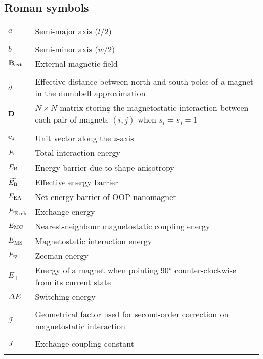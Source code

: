 \subsection*{Roman symbols}
\begin{longtable}[l]{p{60pt} p{350pt}}
	$a$ & Semi-major axis ($l/2$) \\
	&\\

	$b$ & Semi-minor axis ($w/2$) \\
	$\boldsymbol{\mathbf{B}}_\mathrm{ext}$ & External magnetic field \\
	&\\

	$d$ & Effective distance between north and south poles of a magnet in the dumbbell approximation \\
	$\boldsymbol{\mathbf{D}}$ & $N \times N$ matrix storing the magnetostatic interaction between each pair of magnets $(i,j)$ when $s_i=s_j=1$ \\
	&\\

	$\boldsymbol{\mathbf{e}}_z$ & Unit vector along the $z$-axis \\
	$E$ & Total interaction energy \\
	$E_\mathrm{B}$ & Energy barrier due to shape anisotropy \\ %
	$\widetilde{E_\mathrm{B}}$ & Effective energy barrier \\
	$E_\mathrm{EA}$ & Net energy barrier of OOP nanomagnet \\
	$E_\mathrm{Exch}$ & Exchange energy\\
	$E_\mathrm{MC}$ & Nearest-neighbour magnetostatic coupling energy \\
	$E_\mathrm{MS}$ & Magnetostatic interaction energy \\
	$E_\mathrm{Z}$ & Zeeman energy\\
	$E_\perp$ & Energy of a magnet when pointing \ang{90} counter-clockwise from its current state \\
	$\Delta E$ & Switching energy \\
	&\\

	$\mathcal{I}$ & Geometrical factor used for second-order correction on magnetostatic interaction \\
	&\\

	$J$ & Exchange coupling constant \\
	&\\


\end{longtable}
